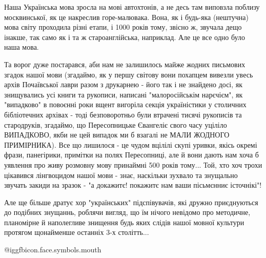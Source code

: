 Наша Українська мова зросла на мові автохтонів, а не десь там виповзла поблизу
москвинської, як це накреслив горе-малювака. Вона, як і будь-яка (нештучна)
мова світу проходила різні етапи, і 1000 років тому, звісно ж, звучала дещо
інакше, так само як і та ж староанглійська, наприклад. Але це все одно було
наша мова. 

Та ворог дуже постарався, аби нам не залишилось майже жодних письмових згадок
нашої мови (згадаймо, як у першу світову вони похапцем вивезли увесь архів
Почаївської лаври разом з друкарнею - його так і не знайдено досі, як
знищувались усі книги та рукописи, написані "малоросійськім нарєчієм", як
"випадково" в повоєнні роки вщент вигоріла секція україністики у столичних
бібліотечних архівах - тоді безповоротньо були втрачені тисячі рукописів та
стародруків, згадаймо, що Пересопницьке Євангеліє свого часу уціліло ВИПАДКОВО,
якби не цей випадок ми б взагалі не МАЛИ ЖОДНОГО ПРИМІРНИКА). Все що лишилося -
це чудом вцілілі скупі уривки, якісь окремі фрази, панегірики, примітки на
полях Пересопниці, але й вони дають нам хоча б уявлення про живу розмовну мову
принаймні 500 років тому... Той, хто хоч трохи цікавився лінгвоцидом нашої мови
- знає, наскільки зухвало та знущально звучать закиди на зразок - "а докажитє!
покажитє нам ваши пісьмєнниє істочнікі"!

Але ще більше дратує хор "українських" підспівувачів, які дружно приєднуються
до подібних знущаннь, роблячи вигляд, що їм нічого невідомо про методичне,
планомірне й наполегливе знищення будь яких слідів нашої мовної культури
протягом щонайменше останніх 3-х столітть...

 @igg{fbicon.face.symbols.mouth} 
